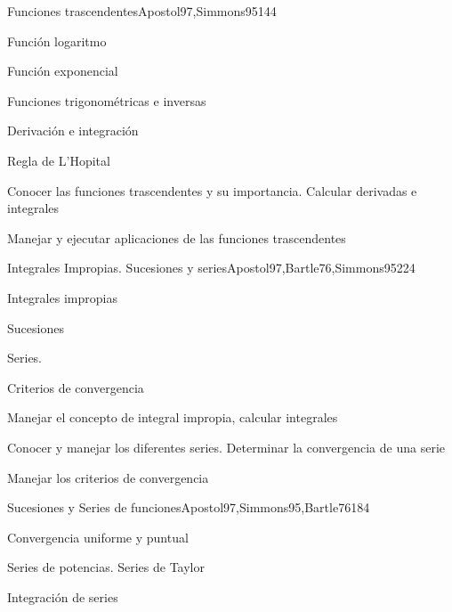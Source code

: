 \begin{syllabus}
\begin{unit}{Funciones trascendentes}{}{Apostol97,Simmons95}{14}{4}
   \begin{topics}
      \item Función logaritmo
      \item Función exponencial
      \item Funciones trigonométricas e inversas
      \item Derivación e integración
      \item Regla de L'Hopital
   \end{topics}

   \begin{learningoutcomes}
      \item Conocer las funciones trascendentes y su importancia. Calcular derivadas e integrales
      \item Manejar y ejecutar aplicaciones de las funciones trascendentes
      \end{learningoutcomes}
\end{unit}

\begin{unit}{Integrales Impropias. Sucesiones y series}{}{Apostol97,Bartle76,Simmons95}{22}{4}
   \begin{topics}
      \item Integrales impropias
      \item Sucesiones
      \item Series.
      \item Criterios de convergencia
   \end{topics}

   \begin{learningoutcomes}
      \item Manejar el concepto de integral impropia, calcular integrales
      \item Conocer y manejar los diferentes series. Determinar la convergencia de una serie
      \item Manejar los criterios de convergencia
      \end{learningoutcomes}
\end{unit}

\begin{unit}{Sucesiones y Series de funciones}{}{Apostol97,Simmons95,Bartle76}{18}{4}
   \begin{topics}
      \item Convergencia uniforme y puntual
      \item Series de potencias. Series de Taylor
      \item Integración de series
   \end{topics}


\end{unit}
\end{syllabus}
